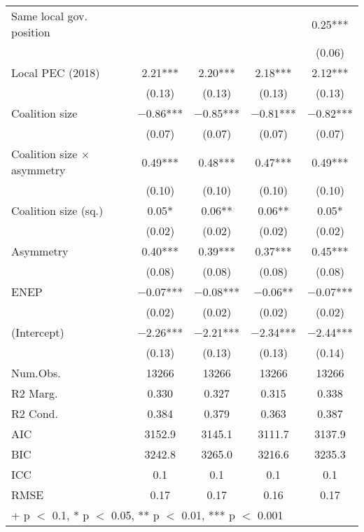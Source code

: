 \begin{longtable}{lcccc}
Same local gov. position &  &  &  & \num{0.25}***\\
 &  &  &  & (\num{0.06})\\
Local PEC (2018) & \num{2.21}*** & \num{2.20}*** & \num{2.18}*** & \num{2.12}***\\
 & (\num{0.13}) & (\num{0.13}) & (\num{0.13}) & (\num{0.13})\\
Coalition size & \num{-0.86}*** & \num{-0.85}*** & \num{-0.81}*** & \num{-0.82}***\\
 & (\num{0.07}) & (\num{0.07}) & (\num{0.07}) & (\num{0.07})\\
Coalition size $\times$ asymmetry & \num{0.49}*** & \num{0.48}*** & \num{0.47}*** & \num{0.49}***\\
 & (\num{0.10}) & (\num{0.10}) & (\num{0.10}) & (\num{0.10})\\
Coalition size (sq.) & \num{0.05}* & \num{0.06}** & \num{0.06}** & \num{0.05}*\\
 & (\num{0.02}) & (\num{0.02}) & (\num{0.02}) & \vphantom{1} (\num{0.02})\\
Asymmetry & \num{0.40}*** & \num{0.39}*** & \num{0.37}*** & \num{0.45}***\\
 & (\num{0.08}) & (\num{0.08}) & (\num{0.08}) & (\num{0.08})\\
ENEP & \num{-0.07}*** & \num{-0.08}*** & \num{-0.06}** & \num{-0.07}***\\
 & (\num{0.02}) & (\num{0.02}) & (\num{0.02}) & (\num{0.02})\\
(Intercept) & \num{-2.26}*** & \num{-2.21}*** & \num{-2.34}*** & \num{-2.44}***\\
 & (\num{0.13}) & (\num{0.13}) & (\num{0.13}) & (\num{0.14})\\
\midrule
Num.Obs. & \num{13266} & \num{13266} & \num{13266} & \num{13266}\\
R2 Marg. & \num{0.330} & \num{0.327} & \num{0.315} & \num{0.338}\\
R2 Cond. & \num{0.384} & \num{0.379} & \num{0.363} & \num{0.387}\\
AIC & \num{3152.9} & \num{3145.1} & \num{3111.7} & \num{3137.9}\\
BIC & \num{3242.8} & \num{3265.0} & \num{3216.6} & \num{3235.3}\\
ICC & \num{0.1} & \num{0.1} & \num{0.1} & \num{0.1}\\
RMSE & \num{0.17} & \num{0.17} & \num{0.16} & \num{0.17}\\
\bottomrule
\multicolumn{5}{l}{\rule{0pt}{1em}+ p $<$ 0.1, * p $<$ 0.05, ** p $<$ 0.01, *** p $<$ 0.001}\\
\end{longtable}
